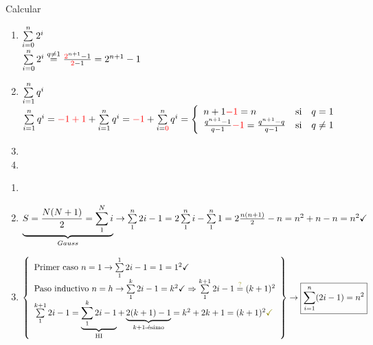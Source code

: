 \documentclass[12pt,a4paper, spanish]{article}
\begin{document}
\ejercicio Calcular \begin{enumerate}[label=\roman*)] \item $\sumatoria{i=0}{n}2^i$\\
	      $ \sumatoria{i=0}{n}2^i \stackrel{q\neq1} = \frac{\red{2}^{n+1} - 1}{\red{$2$} - 1} = 2^{n+1} - 1 $

	\item $\sumatoria{i=1}{n} q^i$\\
	      $\sumatoria{i=1}{n} q^i = \red{$-1 + 1$} + \sumatoria{i=1}{n} q^i = \red{$-1$} + \sumatoria{i = \red{$0$}}{n} q^i =
		      \llave{lll}{
			      n + 1 \red{$-1$} = n & \text{si} & q = 1\\
			      \frac{q^{n+1}-1}{q-1} \red{$-1$} = \frac{q^{n+1} - q}{q-1} & \text{si} & q \distinto 1\\
		      }$

	\item \hacer
	\item \hacer
\end{enumerate}

\ejercicio
\begin{enumerate}[label=\roman*)]
	\item
	      \hacer

	\item $\underbrace{S = \frac{N(N+1)}{2} = \sumatoria{1}{N} i }_{Gauss} \to \sumatoria{1}{n} 2i -1 = 2 \sumatoria{1}{n}i - \sumatoria{1}{n} 1 = 2 \frac{n (n+1)}{2} - n = n^2 + n -n = n^2 \checkmark $

	\item $
		      \llaves{ l }{
			      \text{Primer caso } n = 1 \to \sumatoria{1}{1} 2i -1 = 1 = 1^2 \checkmark\\
			      \text{Paso inductivo } n = h \to \sumatoria{1}{k} 2i -1 = k^2 \checkmark \entonces \sumatoria{1}{k+1} 2i -1 \stackrel{\green{?}}= (k+1)^2\\
			      \sumatoria{1}{k+1} 2i -1 =
			      \HI{
				      \sumatoria{1}{k} 2i -1
			      } + \kmasuno{
				      2(k+1) -1
			      } = k^2 + 2k + 1 = (k+1)^2 \green{\checkmark}
		      } \to \boxed{\sumatoria{i = 1}{n} (2i - 1) = n^2}$
\end{enumerate}

\ejercicio
\hacer
\end{document}
